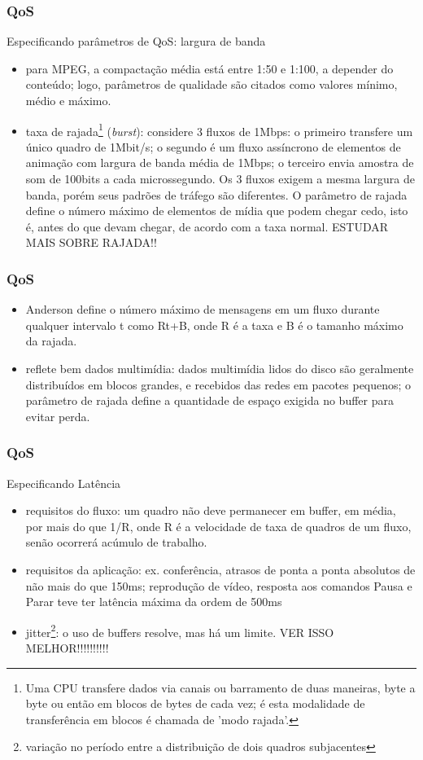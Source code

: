 \documentclass[]{beamer}
\begin{document}
\begin{frame}
  \frametitle{QoS}
Especificando parâmetros de QoS: largura de banda
\begin{itemize}
  \item  para MPEG, a compactação média está entre 1:50 e 1:100, a depender
do conteúdo; logo, parâmetros de qualidade são citados como valores mínimo, médio e máximo.
  \item taxa de rajada\footnote{Uma CPU transfere dados via canais ou barramento 
de duas maneiras, byte a byte ou então em blocos de bytes de cada vez; 
é esta modalidade de transferência em blocos é chamada de 'modo rajada'.\cite{site1:2011}} 
(\emph{burst}): considere 3 fluxos de 1Mbps: o primeiro transfere um único quadro de 1Mbit/s;
o segundo é um fluxo assíncrono de elementos de animação
com largura de banda média de 1Mbps; o terceiro envia amostra de 
som de 100bits a cada microssegundo. Os 3 fluxos exigem a mesma largura de banda, porém
seus padrões de tráfego são diferentes. O parâmetro de rajada define o número máximo de 
elementos de mídia que podem chegar cedo, isto é, antes do que devam chegar, de acordo
com a taxa normal. ESTUDAR MAIS SOBRE RAJADA!!
\end{itemize}
\end{frame}

\begin{frame}
  \frametitle{QoS}
\begin{itemize}
  \item Anderson
define o número máximo de mensagens em um fluxo durante qualquer intervalo t como Rt+B,
onde R é a taxa e B é o tamanho máximo da rajada.
  \item reflete bem dados multimídia: dados multimídia lidos do disco são geralmente 
distribuídos em blocos grandes,
e recebidos das redes em pacotes pequenos; o parâmetro de rajada define a quantidade de
espaço exigida no buffer para evitar perda.
\end{itemize}
\end{frame}

\begin{frame}
  \frametitle{QoS}
Especificando Latência
\begin{itemize}
  \item requisitos do fluxo: um quadro não deve permanecer em buffer, 
em média, por mais do que 1/R,
onde R é a velocidade de taxa de quadros de um fluxo, senão ocorrerá acúmulo de trabalho. 
  \item requisitos da aplicação: ex. conferência, atrasos de ponta a ponta absolutos de não
mais do que 150ms; reprodução de vídeo, resposta aos comandos Pausa e Parar teve ter latência
máxima da ordem de 500ms
  \item jitter\footnote{variação no período entre a distribuição de dois quadros subjacentes}: o
uso de buffers resolve, mas há um limite. VER ISSO MELHOR!!!!!!!!!!
\end{itemize}
\end{frame}
\end{document}
